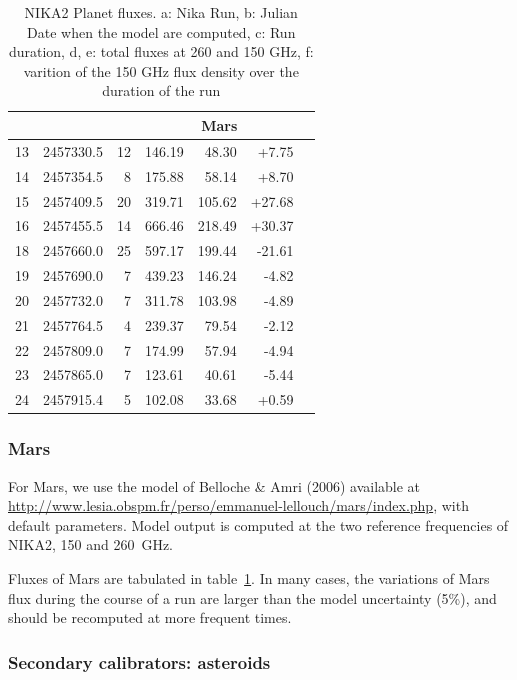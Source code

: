 \begin{table}
\begin{tabular}{|l|r|r|r|r|r|r|}
\hline
         &    &            & \multicolumn{3}{|c|}{Mars}\\
\hline
13 & 2457330.5 &  12 & 146.19 & 48.30 & +7.75\\
14 & 2457354.5 &  8 & 175.88 & 58.14 & +8.70\\
15 & 2457409.5 &  20 & 319.71 & 105.62 & +27.68\\
16 & 2457455.5 &  14 & 666.46 & 218.49 & +30.37\\
18 & 2457660.0 &  25 & 597.17 & 199.44 & -21.61\\
19 & 2457690.0 &  7 & 439.23 & 146.24 & -4.82\\
20 & 2457732.0 &  7 & 311.78 & 103.98 & -4.89\\
21 & 2457764.5 &  4 & 239.37 & 79.54 & -2.12\\
22 & 2457809.0 &  7 & 174.99 & 57.94 & -4.94\\
23 & 2457865.0 &  7 & 123.61 & 40.61 & -5.44\\
24 & 2457915.4 &  5 & 102.08 & 33.68 & +0.59 \\
\hline
\end{tabular}
\caption{NIKA2 Planet fluxes. a: Nika Run, b: Julian Date when the
  model are computed, c: Run duration, d, e: total fluxes at 260 and
  150 GHz, f: varition of the 150 GHz flux density over the duration
  of the run}
\label{tab:fluxPred}
\end{table}


\subsubsection{Mars}
For Mars, we use the model of Belloche \&  Amri (2006) available at
\url{http://www.lesia.obspm.fr/perso/emmanuel-lellouch/mars/index.php},
with default parameters. Model output is computed at the two reference
frequencies of NIKA2, 150 and 260~GHz.

Fluxes of Mars are tabulated in table~\ref{tab:fluxPred}. In many
cases, the variations of Mars flux during the course of a run are
larger than the model uncertainty (5\%), and should be recomputed at
more frequent times. 


\subsubsection{Secondary calibrators: asteroids}

